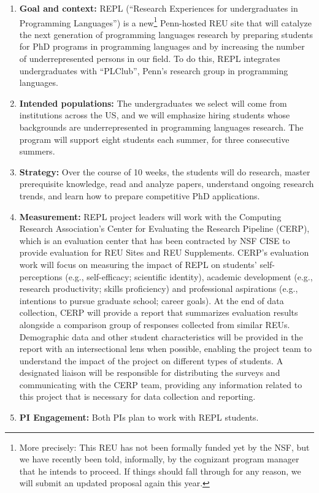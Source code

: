 \begin{enumerate}
\item {\bf Goal and context:} REPL (``Research Experiences for
undergraduates in Programming Languages'') is a new\footnote{More
  precisely: This REU has not been formally funded yet by the NSF, but
  we have recently been told, informally, by the cognizant program
  manager that he intends to proceed.  If things should fall through
  for any reason, we will submit an updated proposal again this year.}
Penn-hosted REU site that will catalyze the next generation of
programming languages research by preparing students for PhD programs
in programming languages and by increasing the number of
underrepresented persons in our field. To do this, REPL integrates
undergraduates with “PLClub”, Penn’s research group in programming
languages.

\item {\bf Intended populations:} The undergraduates we select will
come from institutions across the US, and we will emphasize hiring
students whose backgrounds are underrepresented in programming
languages research.  The program will support eight students each
summer, for three consecutive summers.
\item {\bf Strategy:} Over the course of 10 weeks, the students will do research, master prerequisite knowledge, read and analyze papers, understand ongoing research trends, and learn how to prepare competitive PhD applications.
\item {\bf Measurement:}
REPL project leaders will work with the Computing Research Association’s Center for Evaluating the Research Pipeline (CERP), which is an evaluation center that has been contracted by NSF CISE to provide evaluation for REU Sites and REU Supplements. CERP’s evaluation work will focus on measuring the impact of REPL on students’ self-perceptions (e.g., self-efficacy; scientific identity), academic development (e.g., research productivity; skills proficiency) and professional aspirations (e.g., intentions to pursue graduate school; career goals). At the end of data collection, CERP will provide a report that summarizes evaluation results alongside a comparison group of responses collected from similar REUs. Demographic data and other student characteristics will be provided in the report with an intersectional lens when possible, enabling the project team to understand the impact of the project on different types of students. A designated liaison will be responsible for distributing the surveys and communicating with the CERP team, providing any information related to this project that is necessary for data collection and reporting.
\item {\bf PI Engagement:} Both PIs plan to work with REPL students.
\end{enumerate}



